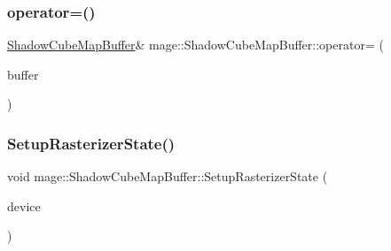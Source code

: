 \hypertarget{structmage_1_1_shadow_cube_map_buffer_aebf8e9d2e0a2ec5bf13dc40b93f97fde}{}\label{structmage_1_1_shadow_cube_map_buffer_aebf8e9d2e0a2ec5bf13dc40b93f97fde} 
\subsubsection{\texorpdfstring{operator=()}{operator=()}\hspace{0.1cm}{\footnotesize\ttfamily [2/2]}}
{\footnotesize\ttfamily \hyperlink{structmage_1_1_shadow_cube_map_buffer}{Shadow\+Cube\+Map\+Buffer}\& mage\+::\+Shadow\+Cube\+Map\+Buffer\+::operator= (\begin{DoxyParamCaption}\item[{\hyperlink{structmage_1_1_shadow_cube_map_buffer}{Shadow\+Cube\+Map\+Buffer} \&\&}]{buffer }\end{DoxyParamCaption})\hspace{0.3cm}{\ttfamily [delete]}}

\hypertarget{structmage_1_1_shadow_cube_map_buffer_af4cb16c81f8a1fdeb0647dda0e7bc258}{}\label{structmage_1_1_shadow_cube_map_buffer_af4cb16c81f8a1fdeb0647dda0e7bc258} 
\subsubsection{\texorpdfstring{Setup\+Rasterizer\+State()}{SetupRasterizerState()}}
{\footnotesize\ttfamily void mage\+::\+Shadow\+Cube\+Map\+Buffer\+::\+Setup\+Rasterizer\+State (\begin{DoxyParamCaption}\item[{I\+D3\+D11\+Device2 $\ast$}]{device }\end{DoxyParamCaption})\hspace{0.3cm}{\ttfamily [private]}}

\hypertarget{structmage_1_1_shadow_cube_map_buffer_a583020f593e4a02f6eda0103f56042bd}{}\label{structmage_1_1_shadow_cube_map_buffer_a583020f593e4a02f6eda0103f56042bd} 
